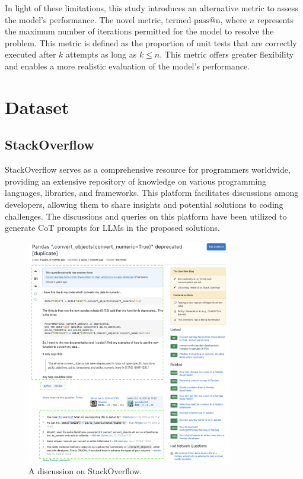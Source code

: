 \documentclass[a4paper,oneside]{book}
\begin{document}
In light of these limitations, this study introduces an alternative metric to assess the model's performance. The novel metric, termed $\text{pass@n}$, where $n$ represents the maximum number of iterations permitted for the model to resolve the problem. This metric is defined as the proportion of unit tests that are correctly executed after $k$ attempts as long as $k \leq n$. This metric offers greater flexibility and enables a more realistic evaluation of the model's performance.

\section{Dataset}
\subsection{}
\subsection{StackOverflow}
StackOverflow serves as a comprehensive resource for programmers worldwide, providing an extensive repository of knowledge on various programming languages, libraries, and frameworks. This platform facilitates discussions among developers, allowing them to share insights and potential solutions to coding challenges. The discussions and queries on this platform have been utilized to generate CoT prompts for LLMs in the proposed solutions.

\begin{figure}[H]
    \centering
    \includegraphics[width=0.8\textwidth]{img/stackoverflow}
    \caption{A discussion on StackOverflow.}\label{fig:stackoverflow}
\end{figure}
\end{document}
